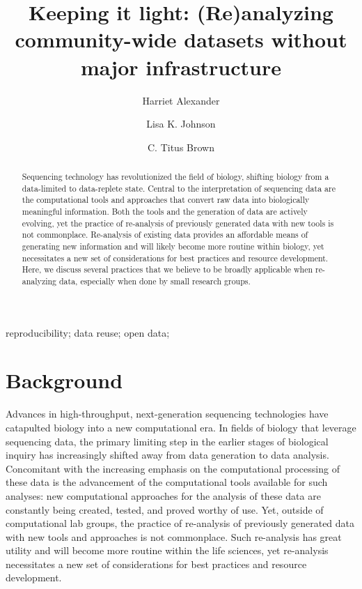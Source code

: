 \documentclass[a4paper,num-refs]{oup-contemporary}
\title{Keeping it light: (Re)analyzing community-wide datasets without major infrastructure}
\author[1]{Harriet Alexander}
\author[1]{Lisa K. Johnson}
\author[1,\authfn{1}]{C. Titus Brown}
\affil[1]{Population Health and Reproduction, University of California, Davis, CA, USA}
\begin{document}
\begin{frontmatter}
\maketitle

  \begin{abstract}
    Sequencing technology has revolutionized the field of biology, shifting biology from a data-limited to data-replete state. Central to the interpretation of sequencing data are the computational tools and approaches that convert raw data into biologically meaningful information. Both the tools and the generation of data are actively evolving, yet the practice of re-analysis of previously generated data with new tools is not commonplace. Re-analysis of existing data provides an affordable means of generating new information and will likely become more routine within biology, yet necessitates a new set of considerations for best practices and resource development. Here, we discuss several practices that we believe to be broadly applicable when re-analyzing data, especially when done by small research groups.

  \end{abstract}

\begin{keywords}
reproducibility; data reuse; open data;
\end{keywords}
\end{frontmatter}

\section{Background}
Advances in high-throughput, next-generation sequencing technologies have catapulted biology into a new computational era. In fields of biology that leverage sequencing data, the primary limiting step in the earlier stages of biological inquiry has increasingly shifted away from data generation to data analysis. Concomitant with the increasing emphasis on the computational processing of these data is the advancement of the computational tools available for such analyses: new computational approaches for the analysis of these data are constantly being created, tested, and proved worthy of use. Yet, outside of computational lab groups, the practice of re-analysis of previously generated data with new tools and approaches is not commonplace. Such re-analysis has great utility and will become more routine within the life sciences, yet re-analysis necessitates a new set of considerations for best practices and resource development.
\end{document}
